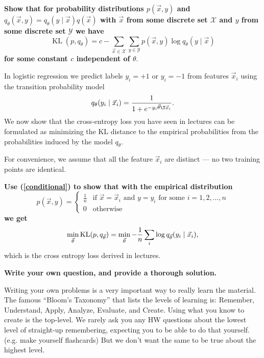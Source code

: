 \documentclass[preview]{standalone}
\begin{document}
\begin{Parts}
\Part \label{conditional} \textbf{Show that for probability distributions $p(\vec x, y)$ and $q_\theta(\vec x, y) = q_\theta(y\mid \vec x) q(\vec x)$ with $\vec x$ from some discrete
set $\mathcal X$ and $y$ from some discrete set $\mathcal Y$ we have}
\begin{equation}
  \operatorname{KL}(p, q_\theta) = c - \sum_{\vec x \in \mathcal X}\sum_{y\in \mathcal Y} p(\vec x, y) \log q_\theta(y \mid \vec x)
\end{equation}
\textbf{for some constant $c$ independent of $\theta$}.


\Part In logistic regression we predict labels $y_i = +1$ or $y_i =
-1$ from features $\vec x_i$ using the transition probability model
\begin{equation}
  q_\theta(y_i \mid \vec x_i) = \frac{1}{1+e^{-y_i\vec\theta\T \vec x_i}}.
\end{equation}
We now show that the cross-entropy loss you have seen in lectures can be formulated
as minimizing the KL distance to
the empirical probabilities from the probabilities induced by the model $q_\theta$.

For convenience, we assume that all the feature $\vec x_i$ are
distinct --- no two training points are identical.

\textbf{Use (\ref{conditional}) to show that with the empirical distribution}
$$p(\vec x, y) = \begin{cases}
 \frac 1 n & \text{if $\vec x = \vec x_i$ and $y = y_i$ for some $i = 1, 2, \dots, n$}\\
 0 & \text{otherwise}
\end{cases}$$
\textbf{we get}
$$
\min_{\vec\theta} \operatorname{KL}(p, q_{\vec\theta}) = \min_{\vec\theta} -\frac 1 n \sum_{i} \log q_{\vec\theta}(y_i\mid \vec x_i),$$
which is the cross entropy loss derived in lectures.


\end{Parts}


{\bf Write your own question, and provide a thorough solution.}

Writing your own problems is a very important way to really learn
the material. The famous ``Bloom's Taxonomy'' that lists the levels of
learning is: Remember, Understand, Apply, Analyze, Evaluate, and
Create. Using what you know to create is the top-level. We rarely ask
you any HW questions about the lowest level of straight-up
remembering, expecting you to be able to do that yourself. (e.g. make
yourself flashcards) But we don't want the same to be true about the
highest level.
\end{document}
